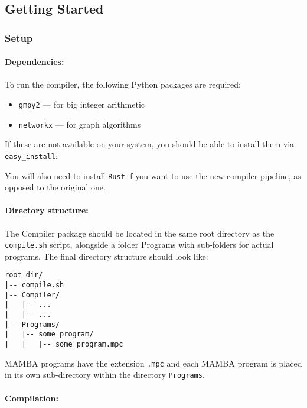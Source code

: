\label{sec:compiler}

\subsection{Getting Started}

\subsubsection{Setup}

\paragraph{Dependencies:}

To run the compiler, the following Python packages are required:
\begin{itemize}
\item \texttt{gmpy2} --- for big integer arithmetic
\item \texttt{networkx} --- for graph algorithms
\end{itemize}
If these are not available on your system, you should be able to install them
via \texttt{easy\_install}:


You will also need to install \texttt{Rust} if you want to use the
new compiler pipeline, as opposed to the original one.

\paragraph{Directory structure:}

The Compiler package should be located in the same root directory as the
\texttt{compile.sh} script, alongside a folder Programs with sub-folders for
actual programs. The final directory structure should look like:

\begin{lstlisting}[language={}]
root_dir/
|-- compile.sh
|-- Compiler/
|   |-- ...
|   |-- ...
|-- Programs/
|   |-- some_program/
|   |   |-- some_program.mpc
\end{lstlisting}
MAMBA programs have the extension \verb+.mpc+ and each MAMBA
program is placed in its own sub-directory within
the directory \verb+Programs+.

\paragraph{Compilation:}

